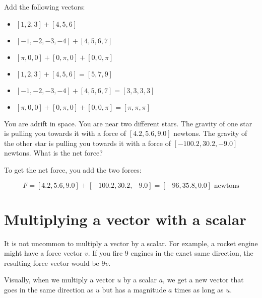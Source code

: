  \begin{Exercise}[title={Adding vectors}, label=adding_vectors]
Add the following vectors:
\begin{itemize}
    \item $[1, 2, 3] + [4, 5, 6]$
    \item $[-1, -2, -3, -4] + [4, 5, 6, 7]$
    \item $[\pi, 0, 0] + [0, \pi, 0] + [0, 0, \pi]$
\end{itemize}
\end{Exercise}
\begin{Answer}[ref=adding_vectors]
    \begin{itemize}
        \item $[1, 2, 3] + [4, 5, 6] = [5, 7, 9]$
        \item $[-1, -2, -3, -4] + [4, 5, 6, 7] = [3, 3, 3, 3]$
        \item $[\pi, 0, 0] + [0, \pi, 0] + [0, 0, \pi] = [\pi, \pi, \pi]$ 
    \end{itemize}
\end{Answer}

    \begin{Exercise}[title={Adding Forces}, label=adding_forces]
        You are adrift in space. You are near two different stars. 
        The gravity of one star is pulling you towards it with a 
        force of $[4.2, 5.6, 9.0]$ newtons.
        The gravity of the other star is pulling you towards it with
        a force of $[-100.2, 30.2, -9.0]$ newtons. What is the net force?
        \end{Exercise}
        \begin{Answer}[ref=adding_forces]
            To get the net force, you add the two forces:

            $$F = [4.2, 5.6, 9.0] + [-100.2, 30.2, -9.0] = [-96, 35.8, 0.0] \text{ newtons}$$
   
\end{Answer}

\section{Multiplying a vector with a scalar}

It is not uncommon to multiply a vector by a scalar.  For example, a rocket engine
might have a force vector $v$.  If you fire 9 engines in the exact same direction,
the resulting force vector would be $9v$.

Visually, when we multiply a vector $u$ by a scalar $a$, we get a new vector that
goes in the same direction as $u$ but has a magnitude $a$ times as long as $u$.

